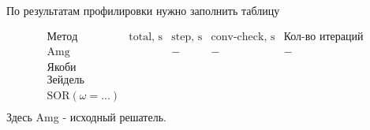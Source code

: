 По результатам профилировки нужно заполнить таблицу

\begin{equation*}
\begin{array}{l|c|c|c|c|c|c}
    Метод & \text{total, s} & \text{step, s} & \text{conv-check, s} & \text{Кол-во итераций} \\
    \hline
    \text{Amg} &   & - & - & - \\
    \hline
    \text{Якоби} &   &  &  & \\
    \hline
    \text{Зейдель} &   &  &  & \\
    \hline
    \text{SOR} (\omega=...)&   &   & & \\
\end{array}
\end{equation*}
Здесь Amg - исходный решатель.
